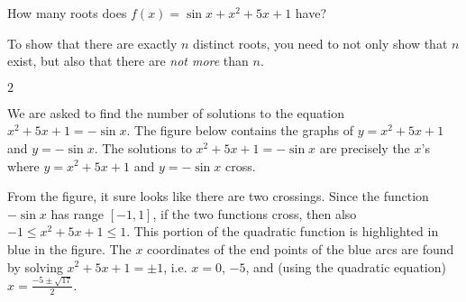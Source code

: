 \begin{Mquestion}
How many roots does $f(x)=\sin x + x^2 + 5x +1$ have?
\end{Mquestion}
\begin{hint}
To show that there are exactly $n$ distinct roots, you need to not only show that $n$ exist, but also that there are \emph{not more} than $n$.
\end{hint}
\begin{answer} $2$
\end{answer}
\begin{solution}
We are asked to find the number of solutions to the equation
          $x^2+5x+1 = -\sin x$.  The figure below contains the graphs
          of $y=x^2+5x+1$ and $y=-\sin x$. The solutions to
          $x^2+5x+1 = -\sin x$ are precisely the $x$'s where
          $y=x^2+5x+1$ and $y=-\sin x$ cross.

\begin{center}\end{center}


         From the figure, it sure looks like there are two crossings.
         Since the function $-\sin x$ has range $[-1,1]$,
         if the two functions cross, then also $-1 \leq x^2+5x+1\leq 1 $.
         This portion of the quadratic function is highlighted in blue in the figure.
         The $x$ coordinates of the end points
         of the blue arcs are found by solving $x^2+5x+1 = \pm1$,
         i.e. $x=0$, $-5$, and (using the quadratic equation)
         $x= \frac{-5\pm\sqrt{17}}{2}$.


\end{solution}
